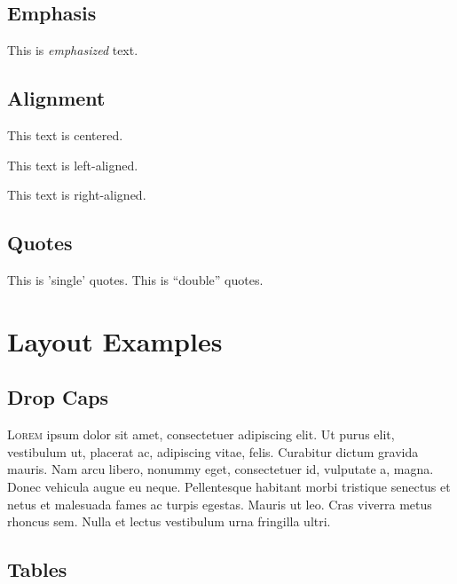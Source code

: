 \documentclass{article}
\begin{document}
\subsection{Emphasis}

This is \emph{emphasized} text.

\subsection{Alignment}

\begin{center}
  This text is centered.
\end{center}

\begin{flushleft}
  This text is left-aligned.
\end{flushleft}

\begin{flushright}
  This text is right-aligned.
\end{flushright}

\subsection{Quotes}

This is 'single' quotes. This is ``double'' quotes.

\vspace*{\fill}
\hrulefill
\vspace*{\fill}
\newpage 


\section{Layout Examples}

\subsection{Drop Caps}

\lettrine[lines=2,loversize=0.2]{L}{orem} ipsum dolor sit amet, consectetuer adipiscing elit. Ut purus elit, vestibulum ut, placerat ac, adipiscing vitae, felis. Curabitur dictum gravida mauris. Nam arcu libero, nonummy eget, consectetuer id, vulputate a, magna. Donec vehicula augue eu neque. Pellentesque habitant morbi tristique senectus et netus et malesuada fames ac turpis egestas. Mauris ut leo. Cras viverra metus rhoncus sem. Nulla et lectus vestibulum urna fringilla ultri.

\subsection{Tables}
\end{document}
